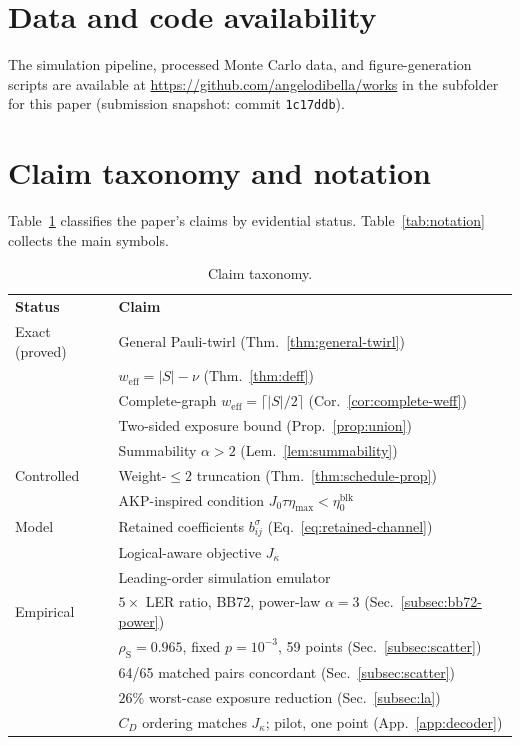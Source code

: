 \documentclass[
aps,
prx,
10pt,
twocolumn,
groupedaddress,
longbibliography,
nofootinbib,
floatfix
]{revtex4-2}
\theoremstyle{definition}
\begin{document}
\section*{Data and code availability}
The simulation pipeline, processed Monte Carlo data, and figure-generation scripts are available at \url{https://github.com/angelodibella/works} in the subfolder for this paper (submission snapshot: commit \texttt{1c17ddb}).

\appendix

\section{Claim taxonomy and notation}
\label{app:tables}

Table~\ref{tab:claim-taxonomy} classifies the paper's claims by evidential status. Table~\ref{tab:notation} collects the main symbols.

\begin{table}[!htbp]
\caption{Claim taxonomy.}\label{tab:claim-taxonomy}
\footnotesize
\renewcommand{\arraystretch}{1.2}%
\begin{ruledtabular}
\begin{tabular}{ll}
\textbf{Status} & \textbf{Claim} \\
\colrule
Exact (proved) & General Pauli-twirl (Thm.~\ref{thm:general-twirl}) \\
& $w_{\mathrm{eff}}=|S|-\nu$ (Thm.~\ref{thm:deff}) \\
& Complete-graph $w_{\mathrm{eff}}=\lceil|S|/2\rceil$ (Cor.~\ref{cor:complete-weff}) \\
& Two-sided exposure bound (Prop.~\ref{prop:union}) \\
& Summability $\alpha>2$ (Lem.~\ref{lem:summability}) \\
\hline
Controlled & Weight-$\le 2$ truncation (Thm.~\ref{thm:schedule-prop}) \\
& AKP-inspired condition $J_0\tau\eta_{\max}<\eta_0^{\mathrm{blk}}$ \\
\hline
Model & Retained coefficients $b_{ij}^\sigma$ (Eq.~\eqref{eq:retained-channel}) \\
& Logical-aware objective $J_\kappa$ \\
& Leading-order simulation emulator \\
\hline
Empirical & $5\times$ LER ratio, BB72, power-law $\alpha\!=\!3$ (Sec.~\ref{subsec:bb72-power}) \\
& $\rho_\mathrm{S}=0.965$, fixed $p\!=\!10^{-3}$, 59 points (Sec.~\ref{subsec:scatter}) \\
& 64/65 matched pairs concordant (Sec.~\ref{subsec:scatter}) \\
& $26\%$ worst-case exposure reduction (Sec.~\ref{subsec:la}) \\
& $C_D$ ordering matches $J_\kappa$; pilot, one point (App.~\ref{app:decoder}) \\
\end{tabular}
\end{ruledtabular}
\end{table}
\end{document}
